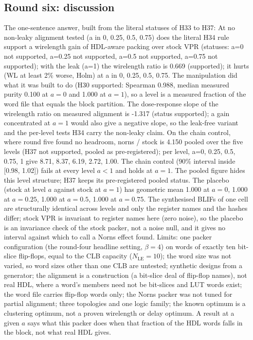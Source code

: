 
\subsection{Round six: discussion}
\label{sec:r6-discussion}
The one-sentence answer, built from the literal statuses of H33 to H37: At no non-leaky alignment tested (a in {0, 0.25, 0.5, 0.75}) does the literal H34 rule support a wirelength gain of HDL-aware packing over stock VPR (statuses: a=0 not supported, a=0.25 not supported, a=0.5 not supported, a=0.75 not supported); with the leak (a=1) the wirelength ratio is 0.669 (supported); it hurts (WL at least 2\% worse, Holm) at a in {0, 0.25, 0.5, 0.75}. The manipulation did what it was built to do (H30 supported: Spearman 0.988, median measured purity 0.100 at $a=0$ and 1.000 at $a=1$), so a level is a measured fraction of the word file that equals the block partition. The dose-response slope of the wirelength ratio on measured alignment is -1.317 (status supported); a gain concentrated at $a=1$ would also give a negative slope, so the leak-free variant and the per-level tests H34 carry the non-leaky claim. On the chain control, where round five found no headroom, norns / stock is 4.150 pooled over the five levels (H37 not supported, pooled as pre-registered); per level, a=0, 0.25, 0.5, 0.75, 1 give 8.71, 8.37, 6.19, 2.72, 1.00. The chain control (90\% interval inside [0.98, 1.02]) fails at every level $a<1$ and holds at $a=1$. The pooled figure hides this level structure; H37 keeps its pre-registered pooled status. The placebo (stock at level $a$ against stock at $a=1$) has geometric mean 1.000 at $a=0$, 1.000 at $a=0.25$, 1.000 at $a=0.5$, 1.000 at $a=0.75$. The synthesised BLIFs of one cell are structurally identical across levels and only the register names and the  hashes differ; stock VPR is invariant to register names here (zero noise), so the placebo is an invariance check of the stock packer, not a noise null, and it gives no interval against which to call a Norns effect found. Limits: one packer configuration (the round-four headline setting, $\beta=4$) on words of exactly ten bit-slice flip-flops, equal to the CLB capacity ($N_{\mathrm{LE}}=10$); the word size was not varied, so word sizes other than one CLB are untested; synthetic designs from a generator; the alignment is a construction (a bit-slice deal of flip-flop names), not real HDL, where a word's members need not be bit-slices and LUT words exist; the word file carries flip-flop words only; the Norns packer was not tuned for partial alignment; three topologies and one logic family; the known optimum is a clustering optimum, not a proven wirelength or delay optimum. A result at a given $a$ says what this packer does when that fraction of the HDL words falls in the block, not what real HDL gives.
